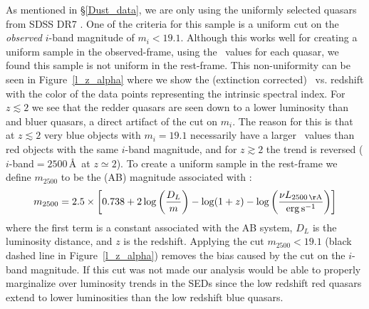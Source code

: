 As mentioned in \S\ref{Dust_data}, we are only using the uniformly selected quasars from SDSS DR7 \citep{Richards:2006a}.  One of the criteria for this sample is a uniform cut on the {\em observed} $i$-band magnitude of $m_i<19.1$.  Although this works well for creating a uniform sample in the observed-frame, using the \ltwofive\ values for each quasar, we found this sample is not uniform in the rest-frame.  This non-uniformity can be seen in Figure~\ref{l_z_alpha} where we show the (extinction corrected) \ltwofive\ vs. redshift with the color of the data points representing the intrinsic spectral index.  For $z\lesssim2$ we see that the redder quasars are seen down to a lower luminosity than and bluer quasars, a direct artifact of the cut on $m_i$. The reason for this is that at $z\lesssim2$ very blue objects with $m_i=19.1$ necessarily have a larger \ltwofive\ values than red objects with the same $i$-band magnitude, and for $z\gtrsim2$ the trend is reversed ($i$-band$=2500$\,\AA\ at $z\simeq2$).
To create a uniform sample in the rest-frame we define $m_{2500}$ to be the (AB) magnitude associated with \ltwofive:
\begin{equation}
	m_{2500} = 2.5 \times \left[0.738 + 2\log{\left(\frac{D_L}{m}\right)} - \log(1+z) - \log{\left(\frac{\nu L_{\rm 2500\,\AA}}{{\rm erg\, s}^{-1}}\right)}\right]
\end{equation}
where the first term is a constant associated with the AB system, $D_L$ is the luminosity distance, and $z$ is the redshift.  Applying the cut $m_{2500}<19.1$ (black dashed line in Figure~\ref{l_z_alpha}) removes the bias caused by the cut on the $i$-band magnitude.  If this cut was not made our analysis would be able to properly marginalize over luminosity trends in the SEDs since the low redshift red quasars extend to lower luminosities than the low redshift blue quasars.

